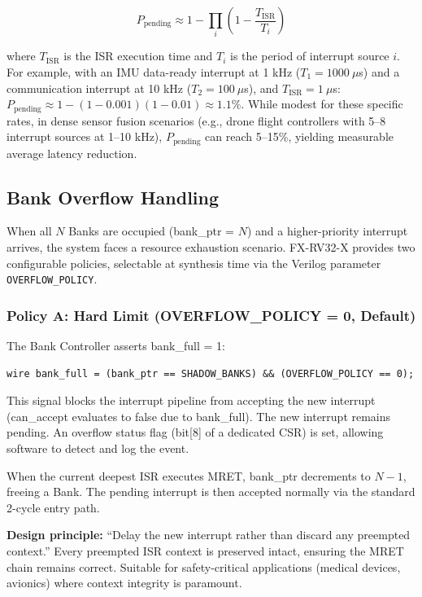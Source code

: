 \documentclass[letterpaper,journal]{IEEEtran}
\begin{document}
\begin{equation}
P_{\text{pending}} \approx 1 - \prod_{i} \left(1 - \frac{T_{\text{ISR}}}{T_i}\right)
\label{eq:prob}
\end{equation}

where $T_{\text{ISR}}$ is the ISR execution time and $T_i$ is the period of interrupt source $i$.
For example, with an IMU data-ready interrupt at 1 kHz ($T_1 = 1000\ \mu$s) and a communication interrupt at 10 kHz ($T_2 = 100\ \mu$s), and $T_{\text{ISR}} = 1\ \mu$s:
$P_{\text{pending}} \approx 1 - (1 - 0.001)(1 - 0.01) \approx 1.1\%$.
While modest for these specific rates, in dense sensor fusion scenarios (e.g., drone flight controllers with 5--8 interrupt sources at 1--10 kHz), $P_{\text{pending}}$ can reach 5--15\%, yielding measurable average latency reduction.

\subsection{Bank Overflow Handling}

When all $N$ Banks are occupied (bank\_ptr = $N$) and a higher-priority interrupt arrives, the system faces a resource exhaustion scenario.
FX-RV32-X provides two configurable policies, selectable at synthesis time via the Verilog parameter \texttt{OVERFLOW\_POLICY}.

\subsubsection{Policy A: Hard Limit (OVERFLOW\_POLICY = 0, Default)}

The Bank Controller asserts bank\_full = 1:

\begin{verbatim}
wire bank_full = (bank_ptr == SHADOW_BANKS) && (OVERFLOW_POLICY == 0);
\end{verbatim}

This signal blocks the interrupt pipeline from accepting the new interrupt (can\_accept evaluates to false due to bank\_full).
The new interrupt remains pending.
An overflow status flag (bit[8] of a dedicated CSR) is set, allowing software to detect and log the event.

When the current deepest ISR executes MRET, bank\_ptr decrements to $N-1$, freeing a Bank.
The pending interrupt is then accepted normally via the standard 2-cycle entry path.

\textbf{Design principle:} ``Delay the new interrupt rather than discard any preempted context.'' Every preempted ISR context is preserved intact, ensuring the MRET chain remains correct.
Suitable for safety-critical applications (medical devices, avionics) where context integrity is paramount.
\end{document}
